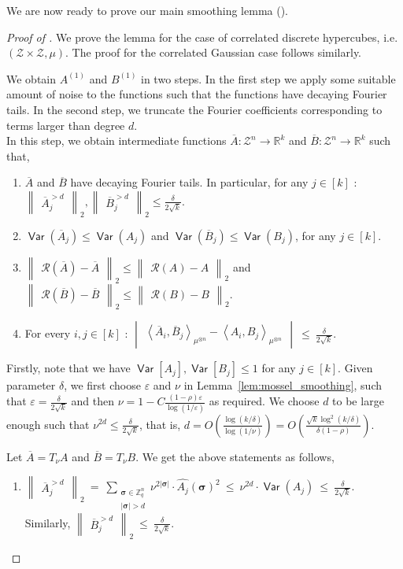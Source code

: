 \documentclass[11pt]{article}
\newcommand{\inparen}[1]{\left ( #1 \right )}
\newcommand{\inangle}[1]{\left \langle #1 \right \rangle}
\newcommand{\inabs}[1]{\begin{vmatrix} #1 \end{vmatrix}}
\newcommand{\norm}[2]{\begin{Vmatrix} #2 \end{Vmatrix}_{#1}}
\DeclareMathOperator*{\Var}{\mathsf{Var}}
\newcommand{\what}[1]{\widehat{#1}}
\newcommand{\eps}{\varepsilon}
\newcommand{\bbR}{{\mathbb R}}
\newcommand{\bbZ}{{\mathbb Z}}
\newcommand{\bsigma}{{\boldsymbol \sigma}}
\newcommand{\calR}{\mathcal{R}}
\newcommand{\calZ}{\mathcal{Z}}
\begin{document}
\noindent We are now ready to prove our main smoothing lemma ().

\begin{proof}[Proof of ]
	We prove the lemma for the case of correlated discrete hypercubes, i.e. $(\calZ \times \calZ, \mu)$. The proof for the correlated Gaussian case follows similarly.
	
	We obtain $A^{(1)}$ and $B^{(1)}$ in two steps. In the first step we apply some suitable amount of noise to the functions such that the functions have decaying Fourier tails. In the second step, we truncate the Fourier coefficients corresponding to terms larger than degree $d$.\\
	
	 In this step, we obtain intermediate functions $\overline{A} : \calZ^n \to \bbR^k$ and $\overline{B} : \calZ^n \to \bbR^k$ such that,
	\begin{enumerate}
		\item $\overline{A}$ and $\overline{B}$ have decaying Fourier tails. In particular, for any $j \in [k]$ : $\norm{2}{\overline{A}_j^{>d}}, \norm{2}{\overline{B}_j^{>d}} \le \frac{\delta}{2 \sqrt{k}}$.
		\item $\Var(\overline{A}_j) \le \Var(A_j)$ and $\Var(\overline{B}_j) \le \Var(B_j)$, for any $j \in [k]$.
		\item $\norm{2}{\calR(\overline{A}) - \overline{A}} \le \norm{2}{\calR(A) - A}$ and $\norm{2}{\calR(\overline{B}) - \overline{B}} \le \norm{2}{\calR(B) - B}$.
		\item For every $i, j \in [k]$ : $\inabs{\inangle{\overline{A}_i, \overline{B}_j}_{\mu^{\otimes n}} - \inangle{A_i, B_j}_{\mu^{\otimes n}}} ~\le~ \frac{\delta}{2 \sqrt{k}}$.
	\end{enumerate}
	
	Firstly, note that we have $\Var[A_j], \Var[B_j] \le 1$ for any $j \in [k]$. Given parameter $\delta$, we first choose $\eps$ and $\nu$ in Lemma~\ref{lem:mossel_smoothing}, such that $\eps = \frac{\delta}{2\sqrt{k}}$ and then $\nu = 1 - C \frac{(1-\rho)\eps}{\log (1/\eps)}$ as required. We choose $d$ to be large enough such that $\nu^{2d} \le \frac{\delta}{2\sqrt{k}}$, that is, $d = O\inparen{\frac{\log (k/\delta)}{\log (1/\nu)}} = O\inparen{\frac{\sqrt{k}\log^2(k/\delta)}{\delta (1-\rho)}}$.
	
	Let $\overline{A} = T_{\nu}A$ and $\overline{B} = T_{\nu}B$. We get the above statements as follows,
	\begin{enumerate}
		\item $\norm{2}{\overline{A}_j^{> d}} ~=~ \sum\limits_{\substack{\bsigma \in \bbZ_q^n \\ |\bsigma| > d}} \nu^{2|\bsigma|} \cdot \what{A_j}(\bsigma)^2 ~\le~ \nu^{2d} \cdot \Var(A_j) ~\le~ \frac{\delta}{2\sqrt{k}}$. Similarly, $\norm{2}{\overline{B}_j^{> d}} ~\le~ \frac{\delta}{2\sqrt{k}}$.
		

\end{enumerate}
\end{proof}
\end{document}
